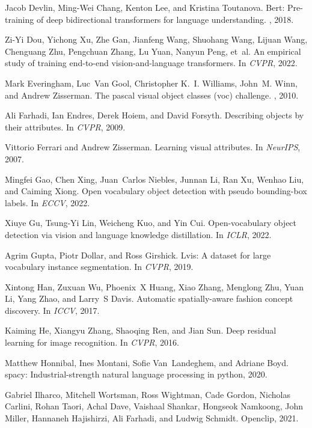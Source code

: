 \documentclass[10pt,twocolumn,letterpaper]{article}
\begin{document}
\begin{thebibliography}{10}
Jacob Devlin, Ming-Wei Chang, Kenton Lee, and Kristina Toutanova.
\newblock Bert: Pre-training of deep bidirectional transformers for language
  understanding.
, 2018.

Zi-Yi Dou, Yichong Xu, Zhe Gan, Jianfeng Wang, Shuohang Wang, Lijuan Wang,
  Chenguang Zhu, Pengchuan Zhang, Lu Yuan, Nanyun Peng, et~al.
\newblock An empirical study of training end-to-end vision-and-language
  transformers.
\newblock In {\em CVPR}, 2022.

Mark Everingham, Luc~Van Gool, Christopher K.~I. Williams, John~M. Winn, and
  Andrew Zisserman.
\newblock The pascal visual object classes (voc) challenge.
, 2010.

Ali Farhadi, Ian Endres, Derek Hoiem, and David Forsyth.
\newblock Describing objects by their attributes.
\newblock In {\em CVPR}, 2009.

Vittorio Ferrari and Andrew Zisserman.
\newblock Learning visual attributes.
\newblock In {\em NeurIPS}, 2007.

Mingfei Gao, Chen Xing, Juan~Carlos Niebles, Junnan Li, Ran Xu, Wenhao Liu, and
  Caiming Xiong.
\newblock Open vocabulary object detection with pseudo bounding-box labels.
\newblock In {\em ECCV}, 2022.

Xiuye Gu, Tsung-Yi Lin, Weicheng Kuo, and Yin Cui.
\newblock Open-vocabulary object detection via vision and language knowledge
  distillation.
\newblock In {\em ICLR}, 2022.

Agrim Gupta, Piotr Dollar, and Ross Girshick.
\newblock Lvis: A dataset for large vocabulary instance segmentation.
\newblock In {\em CVPR}, 2019.

Xintong Han, Zuxuan Wu, Phoenix~X Huang, Xiao Zhang, Menglong Zhu, Yuan Li,
  Yang Zhao, and Larry~S Davis.
\newblock Automatic spatially-aware fashion concept discovery.
\newblock In {\em ICCV}, 2017.

Kaiming He, Xiangyu Zhang, Shaoqing Ren, and Jian Sun.
\newblock Deep residual learning for image recognition.
\newblock In {\em CVPR}, 2016.

Matthew Honnibal, Ines Montani, Sofie Van~Landeghem, and Adriane Boyd.
\newblock spacy: Industrial-strength natural language processing in python,
  2020.

Gabriel Ilharco, Mitchell Wortsman, Ross Wightman, Cade Gordon, Nicholas
  Carlini, Rohan Taori, Achal Dave, Vaishaal Shankar, Hongseok Namkoong, John
  Miller, Hannaneh Hajishirzi, Ali Farhadi, and Ludwig Schmidt.
\newblock Openclip, 2021.


\end{thebibliography}
\end{document}
